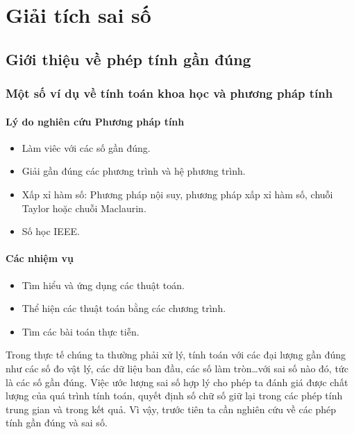 \documentclass[../../Lectures.tex]{subfiles}
\begin{document}
\chapter{Giải tích sai số}

\section{Giới thiệu về phép tính gần đúng}

\subsection{Một số ví dụ về tính toán khoa học và phương pháp tính}

\subsubsection{Lý do nghiên cứu Phương pháp tính}

\begin{itemize}
    \item Làm viêc với các số gần đúng.
    \item Giải gần đúng các phương trình và hệ phương trình.
    \item Xấp xỉ hàm số: Phương pháp nội suy, phương pháp xấp xỉ hàm số, chuỗi
        Taylor hoặc chuỗi Maclaurin.
    \item Số học IEEE\@.    %
\end{itemize}

\subsubsection{Các nhiệm vụ}

\begin{itemize}
    \item Tìm hiểu và ứng dụng các thuật toán.
    \item Thể hiện các thuật toán bằng các chương trình.
    \item Tìm các bài toán thực tiễn.
\end{itemize}

Trong thực tế chúng ta thường phải xử lý, tính toán với các đại lượng gần đúng
như các số đo vật lý, các dữ liệu ban đầu, các số làm tròn…với sai số nào đó,
tức là các số gần đúng. Việc ước lượng sai số hợp lý cho phép ta đánh giá được
chất lượng của quá trình tính toán, quyết định số chữ số giữ lại trong các phép
tính trung gian và trong kết quả. Vì vậy, trước tiên ta cần nghiên cứu về các
phép tính gần đúng và sai số.
\end{document}
